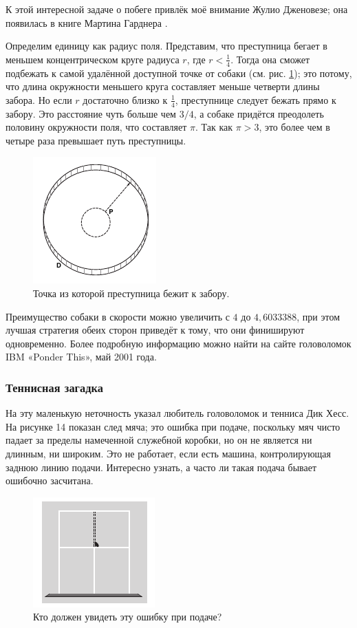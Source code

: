 К этой интересной задаче о побеге привлёк моё внимание Жулио Дженовезе;
она появилась в книге Мартина Гарднера \cite{gardner1977}.

Определим единицу как радиус поля.
Представим, что преступница бегает в меньшем концентрическом круге радиуса $r$, где $r < \tfrac14$.
Тогда она сможет подбежать к самой удалённой доступной точке от собаки (см. рис. \ref{pic:dog});
это потому, что длина окружности меньшего круга составляет меньше четверти длины забора.
Но если $r$ достаточно близко к $\tfrac14$, преступнице следует бежать прямо к забору.
Это расстояние чуть больше чем $3/4$, а собаке придётся преодолеть половину окружности поля, что составляет $\pi$.
Так как $\pi > 3$, это более чем в четыре раза превышает путь преступницы.

\begin{figure}[h!]
\centering
\includegraphics[scale=1]{pics/dog}
\caption{Точка из которой преступница бежит к забору.}
\label{pic:dog}
\end{figure}

Преимущество собаки в скорости можно увеличить с $4$ до $4{,}6033388$, при этом лучшая стратегия обеих сторон приведёт к тому, что они финишируют одновременно.
Более подробную информацию можно найти на сайте головоломок IBM «Ponder This», май 2001 года.

\subsubsection*{Теннисная загадка}

На эту маленькую неточность указал любитель головоломок и тенниса Дик Хесс.
На рисунке 14 показан след мяча; это ошибка при подаче, поскольку мяч чисто падает за пределы намеченной служебной коробки, но он не является ни длинным, ни широким.
Это не работает, если есть машина, контролирующая заднюю линию подачи.
Интересно узнать, а часто ли такая подача бывает ошибочно засчитана.

\begin{figure}[h!]
\centering
\includegraphics[scale=1]{pics/tenis}
\caption{Кто должен увидеть эту ошибку при подаче?}
\label{pic:tenis}
\end{figure}

